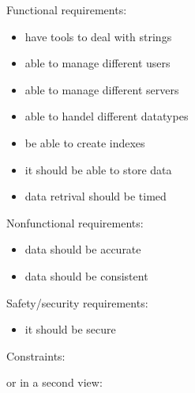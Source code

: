\begin{elenco}
\item Functional requirements:
\begin{itemize}
    \item have tools to deal with strings
    \item able to manage different users
    \item able to manage different servers
    \item able to handel different datatypes
    \item be able to create indexes
    \item it should be able to store data
    \item data retrival should be timed
\end{itemize}
\item Nonfunctional requirements:
\begin{itemize}
    \item data should be accurate
    \item data should be consistent
\end{itemize}
\item Safety/security requirements:\\
\begin{itemize}
	\item it should be secure
\end{itemize}

Constraints:

or in a second view:


\end{elenco}
